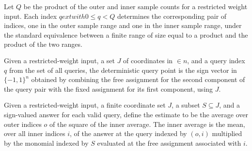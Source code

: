 \begin{definition}
\label{FABL.deterministicRestrictedWeightQueryPair}
\leanok
{}
Let $Q$ be the product of the outer and inner sample counts for a restricted weight
input. Each index $q	ext{ with }0\le q<Q$ determines the corresponding pair of indices,
one in the outer sample range and one in the inner sample range, under the standard
equivalence between a finite range of size equal to a product and the product of the two
ranges.
\end{definition}

\begin{definition}
\label{FABL.deterministicRestrictedWeightQueryPoint}
\leanok
{}
Given a restricted-weight input, a set $J$ of coordinates in $\in{n}$, and a query index
$q$ from the set of all queries, the deterministic query point is the sign vector in
$\{-1,1\}^n$ obtained by combining the free assignment for the second component of the
query pair with the fixed assignment for its first component, using $J$.
\end{definition}

\begin{definition}
\label{FABL.deterministicRestrictedWeightEstimateFromAnswers}
\leanok
{}
Given a restricted-weight input, a finite coordinate set $J$, a subset $S\subseteq J$,
and a sign-valued answer for each valid query, define the estimate to be the average
over outer indices $o$ of the square of the inner average. The inner average is the
mean, over all inner indices $i$, of the answer at the query indexed by $(o,i)$
multiplied by the monomial indexed by $S$ evaluated at the free assignment associated
with $i$.
\end{definition}

